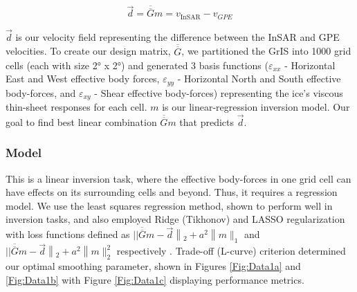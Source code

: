 \documentclass{article}
\begin{document}
$$
\vec{d}=\overline{\overline{G}} m=v_{\text {InSAR}}-v_{GPE}
$$

$\vec{d}$ is our velocity field representing the difference between the InSAR and GPE velocities. To create our design matrix, $\overline{\overline{G}}$, we partitioned the GrIS into 1000 grid cells (each with size 2° x 2°) and generated 3 basis functions ($\varepsilon_{xx}$ - Horizontal East and West effective body forces, $\varepsilon_{yy}$ - Horizontal North and South effective body-forces, and $\varepsilon_{xy}$ - Shear effective body-forces) representing the ice's viscous thin-sheet responses for each cell. $m$ is our linear-regression inversion model. Our goal to find best linear combination $\overline{\overline{G}} m$ that predicts $\vec{d}$.


\subsubsection{Model}

This is a linear inversion task, where the effective body-forces in one grid cell can have effects on its surrounding cells and beyond. Thus, it requires a regression model. We use the least squares regression method, shown to perform well in inversion tasks, and also employed Ridge (Tikhonov) and LASSO regularization with loss functions defined as $|| \overline{\overline{G}} m-\vec{d}\left\|_{2}+a^{2}\right\| m \|_{1}$ and $|| \overline{\overline{G}} m-\vec{d}\left\|_{2}+a^{2}\right\| m \|_{2}^{2}$ respectively \cite{lines_review_1984, marquardt_ridge_1975, tibshirani_regression_2011}. Trade-off (L-curve) criterion determined our optimal smoothing parameter, shown in Figures \ref{Fig:Data1a} and  \ref{Fig:Data1b} with Figure \ref{Fig:Data1c} displaying performance metrics.
\end{document}
